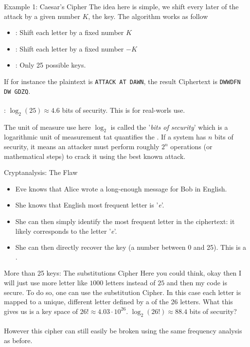 \begin{parag}{Example 1: Caesar's Cipher}
    The idea here is simple, we shift every later of the attack by a given number $K$, the key. The algorithm works as follow 
	\begin{itemize}
	    \item {}: Shift each letter by a fixed number $K$
	    \item {}: Shift each letter by a fixed number $-K$
	    \item {}: Only 25 possible keys.
	\end{itemize}
	If for instance the plaintext is \texttt{ATTACK AT DAWN}, the result Ciphertext is \texttt{DWWDFN DW GDZQ}.\\
	$ $\\
	: $\log_2 \left(25\right) \approx 4.6$ bits of security. This is  for real-worls use.
	\begin{framedremark}
	The unit of measure use here $\log_2$ is called the '\textit{bits of security}' which is a logarithmic unit of measurement tat quantifies the . If a system has $n$ bits of security, it means an attacker must perform roughly $2^{n}$ operations (or mathematical steps) to crack it using the best known attack.
	\end{framedremark}
\end{parag}
\begin{parag}{Cryptanalysis: The Flaw}
    \begin{itemize}
        \item Eve knows that Alice wrote a long-enough message for Bob in English.
        \item She knows that English most frequent letter is '\textit{e}'.
        \item She can then simply identify the most frequent letter in the ciphertext: it likely corresponds to the letter '\textit{e}'.
        \item She can then directly recover the key (a number between 0 and 25). This is a .
    \end{itemize}
\end{parag}
\begin{parag}{More than 25 keys: The substitutions Cipher}
	Here you could think, okay then I will just use more letter like $1000$ letters instead of $25$ and then my code is secure. To do so, one can use the substitution Cipher. In this case each letter is mapped to a unique, different letter defined by a  of the 26 letters. What this gives us is a key space of $26! \approx 4.03 \cdot 10^{26}$. $\log_2\left(26!\right) \approx 88.4$ bits of security?\\
	$ $\\
	However this cipher can still easily be broken using the same frequency analysis as before.
\end{parag}
